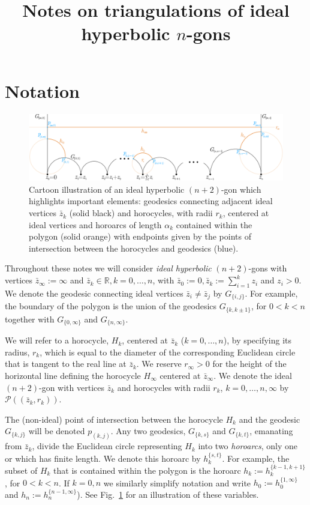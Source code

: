 \documentclass[10pt,a4paper]{article}
\title{Notes on triangulations of ideal hyperbolic $n$-gons}
\date{}
\newcommand{\G}[2]{G_{\{#1,#2\}}}
\newcommand{\h}[2]{h_{#1}^{\{#2\}}}
\newcommand{\p}[2]{p_{(#1,#2)}}
\newcommand{\z}[1]{\bar{z}_{#1}}
\begin{document}
\maketitle




\section{Notation}
\label{sec:notation}

\begin{figure}[h]
    \centering
    \includegraphics[width=1.0\textwidth]{notation2.pdf}
    \caption{Cartoon illustration of an ideal hyperbolic $(n+2)$-gon which highlights important elements: geodesics connecting adjacent ideal vertices $\z{k}$ (solid black) and horocycles, with radii $r_k$, centered at ideal vertices and horoarcs of  length $\alpha_k$ contained within the polygon (solid orange) with endpoints given by the points of intersection between the horocycles and geodesics (blue).}
    \label{fig:notation}
\end{figure}

Throughout these notes we will consider \textit{ideal hyperbolic} $(n+2)$-gons with vertices $\z{\infty} := \infty$ and $\z{k} \in \mathbb{R}, k = 0, \ldots, n$, with $\z{0} := 0, \bar{z}_{k} := \sum_{i=1}^{k} z_i$ and $z_i > 0$. We denote the geodesic connecting ideal vertices $\z{i} \neq \z{j}$ by $\G{i}{j}$. For example, the boundary of the polygon is the union of the geodesics $\G{k}{k \pm 1}$, for $0 < k < n$ together with $\G{0}{\infty}$ and $\G{n}{\infty}$.

We will refer to a horocycle, $H_k$, centered at $\z{k}$ ($k=0,\ldots, n$), by specifying its radius, $r_k$, which is equal to the diameter of the corresponding Euclidean circle that is tangent to the real line at $\z{k}$.  We reserve $r_{\infty} > 0$ for the height of the horizontal line defining the horocycle $H_{\infty}$ centered at $\z{\infty}$. We denote the ideal $(n+2)$-gon with vertices $\z{k}$ and horocycles with radii $r_k$, $k=0, \ldots, n, \infty$ by $\mathcal{P}((\z{k},r_k))$. 

The (non-ideal) point of intersection between the horocycle $H_k$ and the geodesic $\G{k}{j}$ will be denoted $\p{k}{j}$. Any two geodesics, $\G{k}{s}$ and $\G{k}{t}$, emanating from $\z{k}$, divide the Euclidean circle representing $H_k$ into two \textit{horoarcs}, only one or which has finite length. We denote this horoarc by $\h{k}{s,t}$. For example, the subset of $H_k$ that is contained within the polygon is the horoarc $h_{k} := \h{k}{k-1,k+1}$, for $0 < k < n $. If $k=0,n$ we similarly simplify notation and write $h_0 := \h{0}{1,\infty}$ and $h_n := \h{n}{n-1,\infty}$). See Fig.\ \ref{fig:notation} for an illustration of these variables. 
\end{document}
